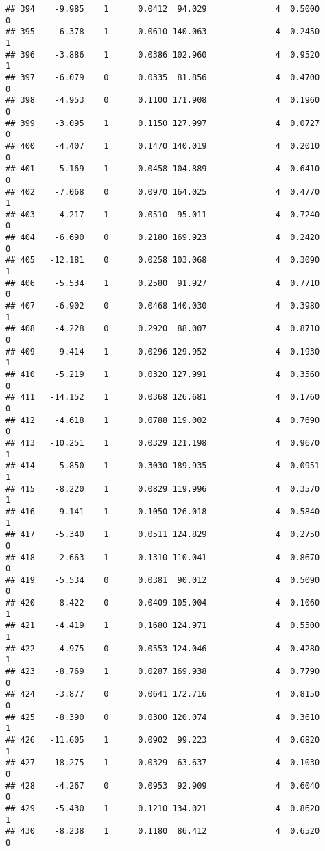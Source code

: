 \documentclass[
]{article}
\begin{document}
\begin{verbatim}
## 394    -9.985    1      0.0412  94.029              4  0.5000      0
## 395    -6.378    1      0.0610 140.063              4  0.2450      1
## 396    -3.886    1      0.0386 102.960              4  0.9520      1
## 397    -6.079    0      0.0335  81.856              4  0.4700      0
## 398    -4.953    0      0.1100 171.908              4  0.1960      0
## 399    -3.095    1      0.1150 127.997              4  0.0727      0
## 400    -4.407    1      0.1470 140.019              4  0.2010      0
## 401    -5.169    1      0.0458 104.889              4  0.6410      0
## 402    -7.068    0      0.0970 164.025              4  0.4770      1
## 403    -4.217    1      0.0510  95.011              4  0.7240      0
## 404    -6.690    0      0.2180 169.923              4  0.2420      0
## 405   -12.181    0      0.0258 103.068              4  0.3090      1
## 406    -5.534    1      0.2580  91.927              4  0.7710      0
## 407    -6.902    0      0.0468 140.030              4  0.3980      1
## 408    -4.228    0      0.2920  88.007              4  0.8710      0
## 409    -9.414    1      0.0296 129.952              4  0.1930      1
## 410    -5.219    1      0.0320 127.991              4  0.3560      0
## 411   -14.152    1      0.0368 126.681              4  0.1760      0
## 412    -4.618    1      0.0788 119.002              4  0.7690      0
## 413   -10.251    1      0.0329 121.198              4  0.9670      1
## 414    -5.850    1      0.3030 189.935              4  0.0951      1
## 415    -8.220    1      0.0829 119.996              4  0.3570      1
## 416    -9.141    1      0.1050 126.018              4  0.5840      1
## 417    -5.340    1      0.0511 124.829              4  0.2750      0
## 418    -2.663    1      0.1310 110.041              4  0.8670      0
## 419    -5.534    0      0.0381  90.012              4  0.5090      0
## 420    -8.422    0      0.0409 105.004              4  0.1060      1
## 421    -4.419    1      0.1680 124.971              4  0.5500      1
## 422    -4.975    0      0.0553 124.046              4  0.4280      1
## 423    -8.769    1      0.0287 169.938              4  0.7790      0
## 424    -3.877    0      0.0641 172.716              4  0.8150      0
## 425    -8.390    0      0.0300 120.074              4  0.3610      1
## 426   -11.605    1      0.0902  99.223              4  0.6820      1
## 427   -18.275    1      0.0329  63.637              4  0.1030      0
## 428    -4.267    0      0.0953  92.909              4  0.6040      0
## 429    -5.430    1      0.1210 134.021              4  0.8620      1
## 430    -8.238    1      0.1180  86.412              4  0.6520      0

\end{verbatim}
\end{document}
